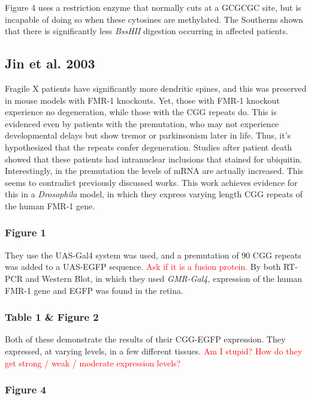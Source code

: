 Figure 4 uses a restriction enzyme that normally cuts at a GCGCGC site, but is incapable of doing so when these cytosines are methylated. The Southerns shown that there is significantly less \textit{BssHII} digestion occurring in affected patients. 

\subsection*{Jin et al. 2003}

Fragile X patients have significantly more dendritic spines, and this was preserved in mouse models with FMR-1 knockouts. Yet, those with FMR-1 knockout experience no degeneration, while those with the CGG repeats do. This is evidenced even by patients with the premutation, who may not experience developmental delays but show tremor or parkinsonism later in life. Thus, it's hypothesized that the repeats confer degeneration. Studies after patient death showed that these patients had intranuclear inclusions that stained for ubiquitin. Interestingly, in the premutation the levels of mRNA are actually increased. This seems to contradict previously discussed works. This work achieves evidence for this in a \textit{Drosophila} model, in which they express varying length CGG repeats of the human FMR-1 gene.

\subsubsection*{Figure 1}
They use the UAS-Gal4 system was used, and a premutation of 90 CGG repeats was added to a UAS-EGFP sequence. \textcolor{red}{Ask if it is a fusion protein.} By both RT-PCR and Western Blot, in which they used \textit{GMR-Gal4}, expression of the human FMR-1 gene and EGFP was found in the retina. 

\subsubsection*{Table 1 \& Figure 2}

Both of these demonstrate the results of their CGG-EGFP expression. They expressed, at varying levels, in a few different tissues. \textcolor{red}{Am I stupid? How do they get strong / weak / moderate expression levels?} 

\subsubsection*{Figure 4}

